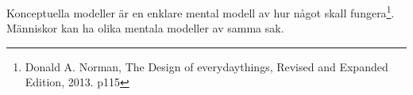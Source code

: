 Konceptuella modeller är en enklare mental modell av hur något skall fungera\footnote{Donald A. Norman, The Design of everydaythings, Revised and Expanded Edition, 2013. p115}.
Människor kan ha olika mentala modeller av samma sak. 